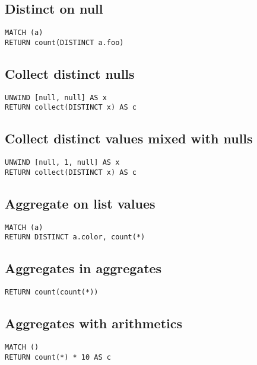 \subsection{Distinct on null}

\begin{lstlisting}
MATCH (a)
RETURN count(DISTINCT a.foo)
\end{lstlisting}

\subsection{Collect distinct nulls}

\begin{lstlisting}
UNWIND [null, null] AS x
RETURN collect(DISTINCT x) AS c
\end{lstlisting}

\subsection{Collect distinct values mixed with nulls}

\begin{lstlisting}
UNWIND [null, 1, null] AS x
RETURN collect(DISTINCT x) AS c
\end{lstlisting}

\subsection{Aggregate on list values}

\begin{lstlisting}
MATCH (a)
RETURN DISTINCT a.color, count(*)
\end{lstlisting}

\subsection{Aggregates in aggregates}

\begin{lstlisting}
RETURN count(count(*))
\end{lstlisting}

\subsection{Aggregates with arithmetics}

\begin{lstlisting}
MATCH ()
RETURN count(*) * 10 AS c
\end{lstlisting}


